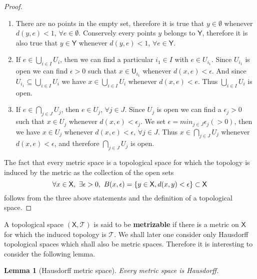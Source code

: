 \documentclass[11pt]{book}
\newcommand{\Tcal}{\mathcal{T}}
\newcommand{\Usf}{\mathsf{U}}
\newcommand{\Xsf}{\mathsf{X}}
\newcommand{\Ysf}{\mathsf{Y}}
\theoremstyle{break}
\newtheorem{lemma}{Lemma}
\newtheorem{proof}{Proof}
\begin{document}
\begin{proof}
%
\begin{enumerate}
\setlength{\itemsep}{-1pt}
%
\item There are no points in the empty set, therefore it is true that $y \in \emptyset$ whenever $d(y,e) < 1$, $\forall e \in \emptyset$. Conservely every points $y$ belongs to $\Ysf$, therefore it is also true that $y \in \Ysf$ whenever $d(y,e) < 1$,  $\forall e \in \Ysf$.%
%
\item If $e \in \bigcup_{i\in I} U_i$, then we can find a particular $i_1 \in I$ with $e \in U_{i_1}$. Since $U_{i_1}$ is open we can find $\epsilon > 0$ such that $x \in \Usf_{i_1}$ whenever $d(x,e) < \epsilon$. And since $U_{i_1} \subseteq \bigcup_{i\in I} U_i$ we have $x \in \bigcup_{i\in I} U_i$ whenever $d(x,e) <e$. Thus $\bigcup_{i\in I} U_i$ is open.%
%
\item If $e \in \bigcap_{j \in J} U_j$, then $e \in U_j$, $\forall j \in J$. Since $U_j$ is open we can find a $\epsilon_j > 0$ such that $x \in U_j$ whenever $d(x,e) < \epsilon_j$. We set $\epsilon = min_{j\in J} \epsilon_j (>0)$, then we have $x \in U_j$ whenever $d(x,e) < \epsilon$, $\forall j \in J$. Thus $x \in \bigcap_{j\in J} U_j$ whenever $d(x,e) < \epsilon$, and therefore $\bigcap_{j\in J} U_j$ is open.
%
\end{enumerate}
%
\vspace*{2pt}
%
The fact that every metric space is a topological space for which the topology is induced by the metric as the collection of the open sets
\vspace*{-8pt}
\begin{equation*}
\forall x \in \Xsf , \ \exists \epsilon > 0, \ B(x,\epsilon) = \left\{ y \in \Xsf , d(x,y) < \epsilon \right\}\subset \Xsf
\vspace*{-8pt}
\end{equation*}
%
follows from the three above statements and the definition of a topological space.
\end{proof}


A topological space $(\Xsf, \Tcal)$ is said to be \textbf{metrizable} if there is a metric on $\Xsf$ for which the induced topology is $\Tcal$. We shall later one consider only Hausdorff topological spaces which shall also be metric spaces. Therefore it is interesting to consider the following lemma.


\begin{lemma}[Hausdorff metric space]
Every metric space is Hausdorff. 
\end{lemma}
\end{document}
